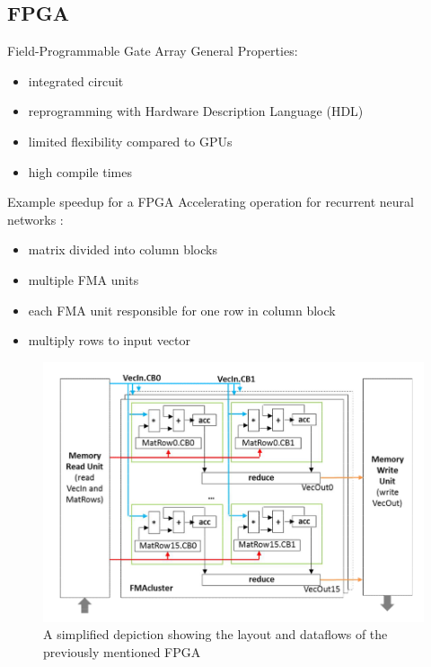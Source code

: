 \documentclass[en]{sdqbeamer}
\begin{document}
\subsection{FPGA}
\begin{frame}{Field-Programmable Gate Array}
	General Properties:
	\begin{itemize}
		\item integrated circuit
		\item reprogramming with Hardware Description Language (HDL)
		\item limited flexibility compared to GPUs
		\item high compile times
	\end{itemize}
\end{frame}

\begin{frame}{Example speedup for a FPGA}
	Accelerating operation for recurrent neural networks \cite{nurvitadhi2016accelerating}:
	\begin{itemize}
		\item matrix divided into column blocks
		\item multiple FMA units
		\item each FMA unit responsible for one row in column block
		\item multiply rows to input vector
	\end{itemize}
\end{frame}

\begin{frame}
	\begin{figure}
		\centering
		\includegraphics[width= 0.55\paperwidth]{pictures/fpga_operations.png}
		\caption{A simplified depiction showing the layout and dataflows of the previously mentioned FPGA \cite{nurvitadhi2016accelerating}}
	\end{figure}
\end{frame}
\end{document}
